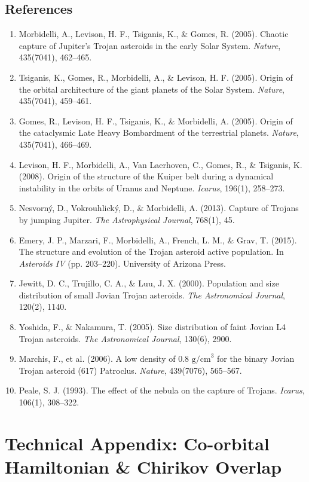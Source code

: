 \documentclass[11pt,a4paper]{article}
\begin{document}
\subsection*{References}
\begin{enumerate}
    \item Morbidelli, A., Levison, H. F., Tsiganis, K., \& Gomes, R. (2005). Chaotic capture of Jupiter's Trojan asteroids in the early Solar System. \textit{Nature}, 435(7041), 462--465.
    \item Tsiganis, K., Gomes, R., Morbidelli, A., \& Levison, H. F. (2005). Origin of the orbital architecture of the giant planets of the Solar System. \textit{Nature}, 435(7041), 459--461.
    \item Gomes, R., Levison, H. F., Tsiganis, K., \& Morbidelli, A. (2005). Origin of the cataclysmic Late Heavy Bombardment of the terrestrial planets. \textit{Nature}, 435(7041), 466--469.
    \item Levison, H. F., Morbidelli, A., Van Laerhoven, C., Gomes, R., \& Tsiganis, K. (2008). Origin of the structure of the Kuiper belt during a dynamical instability in the orbits of Uranus and Neptune. \textit{Icarus}, 196(1), 258--273.
    \item Nesvorn{\'y}, D., Vokrouhlick{\'y}, D., \& Morbidelli, A. (2013). Capture of Trojans by jumping Jupiter. \textit{The Astrophysical Journal}, 768(1), 45.
    \item Emery, J. P., Marzari, F., Morbidelli, A., French, L. M., \& Grav, T. (2015). The structure and evolution of the Trojan asteroid active population. In \textit{Asteroids IV} (pp. 203--220). University of Arizona Press.
    \item Jewitt, D. C., Trujillo, C. A., \& Luu, J. X. (2000). Population and size distribution of small Jovian Trojan asteroids. \textit{The Astronomical Journal}, 120(2), 1140.
    \item Yoshida, F., \& Nakamura, T. (2005). Size distribution of faint Jovian L4 Trojan asteroids. \textit{The Astronomical Journal}, 130(6), 2900.
    \item Marchis, F., et al. (2006). A low density of $0.8\text{ g/cm}^3$ for the binary Jovian Trojan asteroid (617) Patroclus. \textit{Nature}, 439(7076), 565--567.
    \item Peale, S. J. (1993). The effect of the nebula on the capture of Trojans. \textit{Icarus}, 106(1), 308--322.
\end{enumerate}

\appendix
\section{Technical Appendix: Co-orbital Hamiltonian \& Chirikov Overlap}
\end{document}
